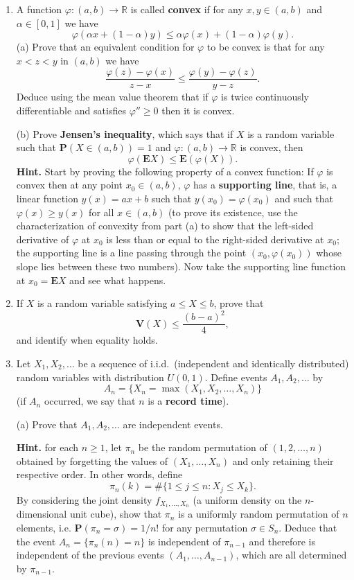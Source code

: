 \documentclass[12pt]{article}
\newcommand{\R}{\mathbb{R}}
\newcommand{\prob}{\mathbf{P}}
\newcommand{\var}{\mathbf{V}}
\theoremstyle{example}
\begin{document}
\begin{enumerate}
\item A function $\varphi:(a,b)\to\R$ is called \textbf{convex} if for any $x,y\in (a,b)$ and $\alpha\in [0,1]$ we have
$$ \varphi(\alpha x + (1-\alpha)y) \le \alpha \varphi(x) + (1-\alpha) \varphi(y). $$
(a) Prove that an equivalent condition for $\varphi$ to be convex is that for any $x<z<y$ in $(a,b)$ we have
$$ \frac{\varphi(z)-\varphi(x)}{z-x} \le \frac{\varphi(y)-\varphi(z)}{y-z}. $$
Deduce using the mean value theorem that if $\varphi$ is twice continuously differentiable and satisfies $\varphi''\ge 0$ then it is convex.

\medskip \noindent
(b) Prove \textbf{Jensen's inequality}, which says that if $X$ is a random variable such that $\prob(X\in (a,b))=1$ and $\varphi:(a,b)\to\R$ is convex, then
$$ \varphi(\textbf{E}X) \le \textbf{E}(\varphi(X)). $$
\textbf{Hint.} Start by proving the following property of a convex function: If $\varphi$ is convex then at any point $x_0\in (a,b)$, $\varphi$ has a \textbf{supporting line}, that is, a linear function $y(x)=ax+b$ such that $y(x_0)=\varphi(x_0)$ and such that $\varphi(x)\ge y(x)$ for all $x\in(a,b)$ (to prove its existence, use the characterization of convexity from part (a) to show that the left-sided derivative of $\varphi$ at $x_0$ is less than or equal to the right-sided derivative at $x_0$; the supporting line is a line passing through the point $(x_0,\varphi(x_0))$ whose slope lies between these two numbers).
Now take the supporting line function at $x_0=\textbf{E}X$ and see what happens.

\item If $X$ is a random variable satisfying $a\le X\le b$, prove that
$$ \var(X) \le \frac{(b-a)^2}{4}, $$
and identify when equality holds.



\item Let $X_1, X_2, \ldots$ be a sequence of i.i.d.\ (independent and identically distributed) random variables with distribution $U(0,1)$. Define events $A_1, A_2, \ldots$ by
$$ A_n = \{ X_n = \max(X_1,X_2,\ldots,X_n) \} $$
(if $A_n$ occurred, we say that $n$ is a \textbf{record time}).

\medskip\noindent
(a) Prove that $A_1,A_2,\ldots$ are independent events. 

\textbf{Hint.} for each $n\ge 1$, let $\pi_n$ be the random permutation of $(1,2,\ldots,n)$ obtained by forgetting the values of $(X_1,\ldots,X_n)$ and only retaining their respective order. In other words, define 
$$\pi_n(k) = \#\{1\le j\le n : X_j \le X_k\}.$$ By considering the joint density $f_{X_1,\ldots,X_n}$ (a uniform density on the $n$-dimensional unit cube), show that $\pi_n$ is a uniformly random permutation of $n$ elements, i.e. $\prob(\pi_n = \sigma) = 1/n!$ for any permutation $\sigma \in S_n$. Deduce that the event $A_n = \{\pi_n(n)=n\}$ is independent of $\pi_{n-1}$ and therefore is independent of the previous events $(A_1,\ldots,A_{n-1})$, which are all determined by $\pi_{n-1}$.


\end{enumerate}
\end{document}

